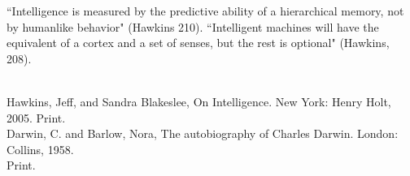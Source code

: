 \documentclass[11pt, oneside]{article}
\begin{document}
\par ``Intelligence is measured by the predictive ability of a hierarchical memory, not by humanlike behavior" (Hawkins 210). ``Intelligent machines will have the equivalent of a cortex and a set of senses, but the rest is optional" (Hawkins, 208). 

\noindent 

\begin{workscited}
\bibent \\
\bibent Hawkins, Jeff, and Sandra Blakeslee, On Intelligence. New York: Henry Holt, 2005. Print.\\
\bibent Darwin, C. and Barlow, Nora, The autobiography of Charles Darwin. London: Collins, 1958.\\
Print. \\
\end{workscited}
\end{document}
